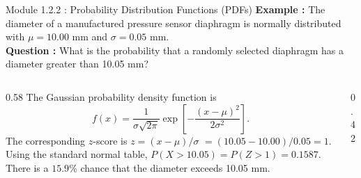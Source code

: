 \documentclass{beamer}
\begin{document}
\begin{frame}{Module 1.2.2 : Probability Distribution Functions (PDFs)}
\scriptsize
\textbf{Example : } The diameter of a manufactured pressure sensor diaphragm is normally distributed with $\mu = 10.00$ mm and $\sigma = 0.05$ mm. \\ \vspace{0.25cm}
\textbf{Question : } What is the probability that a randomly selected diaphragm has a diameter greater than 10.05 mm? \\ \vspace{0.5cm}
\begin{columns}
\begin{column}{0.58\textwidth}
\scriptsize
The Gaussian probability density function is
\begin{equation}
f(x)=
\frac{1}{\sigma\sqrt{2\pi}}
\exp\!\left[
-\frac{(x-\mu)^2}{2\sigma^2}
\right].
\end{equation}
The corresponding $z$-score is $z=(x-\mu)/\sigma$ $=(10.05-10.00)/0.05=1$.  Using the standard normal table, $P(X>10.05) = P(Z>1) = 0.1587$.  There is a $15.9$\% chance that the diameter exceeds 10.05 mm.
\end{column}
\begin{column}{0.42\textwidth}
\centering
{}
\end{column}
\end{columns}
\end{frame}
\end{document}
